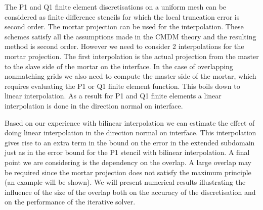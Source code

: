 \documentclass[11pt]{article}
\begin{document}
The P1 and Q1 finite element discretisations on a uniform mesh can be
considered as finite difference stencils for which the local truncation
error is second order.  The mortar projection can be used for the
interpolation.  These schemes satisfy all the assumptions made in the CMDM
theory and the resulting method is second order.  However we need to
consider 2 interpolations for the mortar projection.  The first
interpolation is the actual projection from the master to the slave side of
the mortar on the interface.  In the case of overlapping nonmatching grids
we also need to compute the master side of the mortar, which requires
evaluating the P1 or Q1 finite element function.  This boils down to linear
interpolation.  As a result for P1 and Q1 finite elements a linear
interpolation is done in the direction normal on interface.


 
Based on our experience with bilinear interpolation we can estimate the
effect of doing linear interpolation in the direction normal on interface.
This interpolation gives rise to an extra term in the bound on the error in
the extended subdomain just as in the error bound for the P1 stencil with
bilinear interpolation.  A final point we are considering is the dependency
on the overlap.  A large overlap may be required since the mortar
projection does not satisfy the maximum principle (an example will be
shown).  We will present numerical results illustrating the influence of
the size of the overlap both on the accuracy of the discretisation and on
the performance of the iterative solver.
\end{document}

